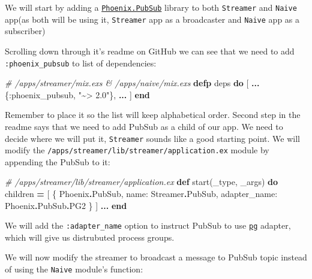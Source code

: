 \documentclass[
]{book}
\newenvironment{Shaded}{\begin{snugshade}}{\end{snugshade}}
\newcommand{\CommentTok}[1]{\textcolor[rgb]{0.56,0.35,0.01}{\textit{#1}}}
\newcommand{\ConstantTok}[1]{\textcolor[rgb]{0.00,0.00,0.00}{#1}}
\newcommand{\KeywordTok}[1]{\textcolor[rgb]{0.13,0.29,0.53}{\textbf{#1}}}
\newcommand{\NormalTok}[1]{#1}
\newcommand{\OperatorTok}[1]{\textcolor[rgb]{0.81,0.36,0.00}{\textbf{#1}}}
\newcommand{\StringTok}[1]{\textcolor[rgb]{0.31,0.60,0.02}{#1}}
\newcommand{\VariableTok}[1]{\textcolor[rgb]{0.00,0.00,0.00}{#1}}
\begin{document}
We will start by adding a \href{https://github.com/phoenixframework/phoenix_pubsub}{\texttt{Phoenix.PubSub}} library to both \texttt{Streamer} and \texttt{Naive} app(as both will be using it, \texttt{Streamer} app as a broadcaster and \texttt{Naive} app as a subscriber)

Scrolling down through it's readme on GitHub we can see that we need to add \texttt{:phoenix\_pubsub} to list of dependencies:

\begin{Shaded}
\begin{Highlighting}[]
\CommentTok{\# /apps/streamer/mix.exs \& /apps/naive/mix.exs}
  \KeywordTok{defp}\NormalTok{ deps }\KeywordTok{do}
\NormalTok{    [}
      \OperatorTok{...}
\NormalTok{      \{}\VariableTok{:phoenix\_pubsub}\NormalTok{, }\StringTok{"\textasciitilde{}\textgreater{} 2.0"}\NormalTok{\},}
      \OperatorTok{...}
\NormalTok{    ]}
  \KeywordTok{end}
\end{Highlighting}
\end{Shaded}

Remember to place it so the list will keep alphabetical order. Second step in the readme says that we need to add PubSub as a child of our app. We need to decide where we will put it, \texttt{Streamer} sounds like a good starting point. We will modify the \texttt{/apps/streamer/lib/streamer/application.ex} module by appending the PubSub to it:

\begin{Shaded}
\begin{Highlighting}[]
\CommentTok{\# /apps/streamer/lib/streamer/application.ex}
  \KeywordTok{def}\NormalTok{ start(\_type, \_args) }\KeywordTok{do}
\NormalTok{    children }\OperatorTok{=}\NormalTok{ [}
\NormalTok{      \{}
        \ConstantTok{Phoenix}\OperatorTok{.}\ConstantTok{PubSub}\NormalTok{,}
        \VariableTok{name:} \ConstantTok{Streamer}\OperatorTok{.}\ConstantTok{PubSub}\NormalTok{, }\VariableTok{adapter\_name:} \ConstantTok{Phoenix}\OperatorTok{.}\ConstantTok{PubSub}\OperatorTok{.}\ConstantTok{PG2}
\NormalTok{      \}}
\NormalTok{    ]}
    \OperatorTok{...}
  \KeywordTok{end}
\end{Highlighting}
\end{Shaded}

We will add the \texttt{:adapter\_name} option to instruct PubSub to use \href{http://erlang.org/doc/man/pg.html}{\texttt{pg}} adapter, which will give us distrubuted process groups.

We will now modify the streamer to broadcast a message to PubSub topic instead of using the \texttt{Naive} module's function:
\end{document}
